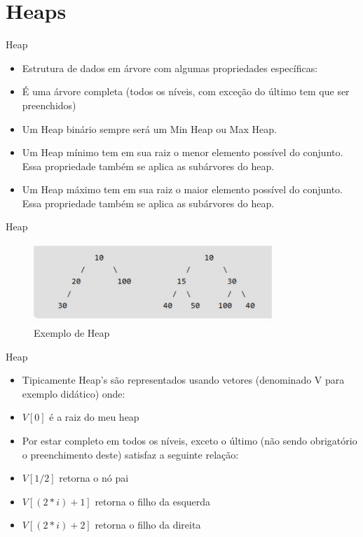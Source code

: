 \section{Heaps}

\begin{frame}
	\begin{block}{Heap}
		\begin{itemize}
			\item Estrutura de dados em árvore com algumas propriedades específicas:
			\item É uma árvore completa (todos os níveis, com exceção do último tem que ser preenchidos)
			\item Um Heap binário sempre será um Min Heap ou Max Heap.
			\item Um Heap mínimo tem em sua raiz o menor elemento possível do conjunto. Essa propriedade também se aplica as subárvores do heap.
			\item Um Heap máximo tem em sua raiz o maior elemento possível do conjunto. Essa propriedade também se aplica as subárvores do heap.
		\end{itemize}
	\end{block}
\end{frame}

\begin{frame}
	\begin{block}{Heap}
		\begin{figure}[!htb]
			\centering	  				
			\includegraphics[height=3cm, width = 9cm]{./pic/heap.jpg}
			\caption{Exemplo de Heap \cite{GEEKS_2018}}
		\end{figure}
	\end{block}
\end{frame}

\begin{frame}
	\begin{block}{Heap}
		\begin{itemize}
			\item Tipicamente Heap's são representados usando vetores (denominado V para exemplo didático) onde:
			\item  $V[0]$ é a raiz do meu heap
			\item Por estar completo em todos os níveis, exceto o último (não sendo obrigatório o preenchimento deste) satisfaz a seguinte relação:
			\item $V[1/2]$ retorna o nó pai
			\item $V[(2*i)+1]$ retorna o filho da esquerda
			\item $V[(2*i)+2]$ retorna o filho da direita
		\end{itemize}
	\end{block}
\end{frame}

